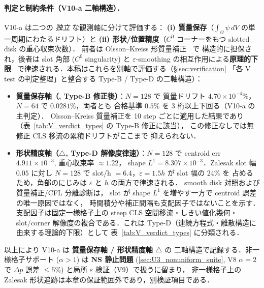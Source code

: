 \paragraph{判定と制約条件（V10-a 二軸構造）．}
V10-a は二つの \emph{独立} な観測軸に分けて評価する：
\textbf{(i) 質量保存}（$\int_\Omega \psi\,dV$ の単一周期にわたるドリフト）と
\textbf{(ii) 形状/位置精度}（$C^0$ コーナーをもつ slotted disk の重心収束次数）．
前者は Olsson--Kreiss 形質量補正~\cite{OlssonKreiss2005} で
構造的に担保され，後者は slot 角部 ($C^0$ singularity) と $\varepsilon$-smoothing
の相互作用による\textbf{原理的下限}~\cite{Zalesak1979,OlssonKreiss2005}
で律速される．本稿はこれらを別軸で評価する（§\ref{sec:verification}
「各 V test の判定整理」と整合する Type-B / Type-D の二軸構造）：
\begin{itemize}\setlength{\itemsep}{0pt}
  \item \textbf{質量保存軸（\checkmark, Type-B 修正後）}：$N=128$ で
        質量ドリフト $4.70\times 10^{-4}\%$，$N=64$ で $0.0281\%$，両者とも
        合格基準 $0.5\%$ を 3 桁以上下回る（V10-a の主判定）．
        Olsson--Kreiss 質量補正を 10 step ごとに適用した結果であり
        （表~\ref{tab:V_verdict_types} の Type-B 修正に該当），
        この修正なしでは無修正 CLS 移流の累積ドリフトがここまで
        抑えられない．
  \item \textbf{形状精度軸（$\triangle$, Type-D 解像度律速）}：$N=128$ で
        centroid err $4.911\times 10^{-3}$, 重心収束率 $\approx 1.22$，
        shape $L^1 = 8.307\times 10^{-3}$．Zalesak slot 幅 $0.05$ に対し
        $N=128$ で slot/h $= 6.4$，$\varepsilon=1.5h$ が slot 幅の $24\%$ を
        占めるため，角部のにじみは $\varepsilon$ と $h$ の両方で律速される．
        smooth disk 対照および質量補正/CFL 分離診断は，
        slot が shape $L^1$ を増やす一方で centroid 誤差の唯一原因ではなく，
        時間積分や補正間隔も支配因子ではないことを示す．
        支配因子は固定一様格子上の steep CLS
        空間移流・しきい値化幾何・slot/corner 解像度の複合である．これは
        Type-D（連続方程式・離散構造に由来する理論的下限）として
        表~\ref{tab:V_verdict_types} に分類される．
\end{itemize}
以上により V10-a は \textbf{質量保存軸 \checkmark / 形状精度軸 $\triangle$} の
二軸構造で記録する．非一様格子サポート ($\alpha>1$) は
\textbf{NS 静止問題} (\autoref{sec:U3_nonuniform_suite}, V8 $\alpha=2$ で
$\Delta p$ 誤差 $\le 5\%$) と局所 $\varepsilon$ 検証（V9）で扱うに留まり，
非一様格子上の Zalesak 形状追跡は本章の保証範囲外であり，別検証項目である．

